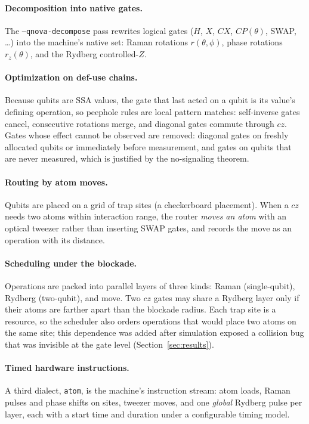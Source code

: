 \documentclass[11pt]{article}
\begin{document}
\paragraph{Decomposition into native gates.} The \texttt{--qnova-decompose} pass rewrites logical gates
($H$, $X$, $CX$, $CP(\theta)$, SWAP, \dots) into the machine's native set: Raman rotations $r(\theta,\phi)$, phase
rotations $r_z(\theta)$, and the Rydberg controlled-$Z$.

\paragraph{Optimization on def-use chains.} Because qubits are SSA values, the gate that last acted on a qubit is its
value's defining operation, so peephole rules are local pattern matches: self-inverse gates cancel, consecutive
rotations merge, and diagonal gates commute through $cz$. Gates whose effect cannot be observed are removed: diagonal
gates on freshly allocated qubits or immediately before measurement, and gates on qubits that are never measured,
which is justified by the no-signaling theorem.

\paragraph{Routing by atom moves.} Qubits are placed on a grid of trap sites (a checkerboard placement). When a
$cz$ needs two atoms within interaction range, the router \emph{moves an atom} with an optical tweezer rather than
inserting SWAP gates, and records the move as an operation with its distance.

\paragraph{Scheduling under the blockade.} Operations are packed into parallel layers of three kinds: Raman
(single-qubit), Rydberg (two-qubit), and move. Two $cz$ gates may share a Rydberg layer only if their atoms are
farther apart than the blockade radius. Each trap site is a resource, so the scheduler also orders operations that
would place two atoms on the same site; this dependence was added after simulation exposed a collision bug that was
invisible at the gate level (Section~\ref{sec:results}).

\paragraph{Timed hardware instructions.} A third dialect, \texttt{atom}, is the machine's instruction stream: atom
loads, Raman pulses and phase shifts on sites, tweezer moves, and one \emph{global} Rydberg pulse per layer, each
with a start time and duration under a configurable timing model.
\end{document}
